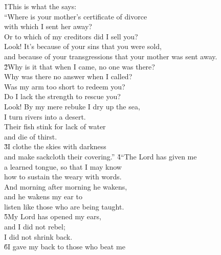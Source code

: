 \begin{poetry}
\poeml {}
\v{1}This is what the  says: \\
\poeml ``Where is your mother's certificate of divorce \\
\poemll    with which I sent her away? \\
\poeml Or to which of my creditors did I sell you? \\
\poemll    Look! It's because of your sins that you were sold, \\
\poemlll       and because of your transgressions that your mother was sent away. \\
\poeml \v{2}Why is it that when I came, no one was there? \\
\poemll    Why was there no answer when I called? \\
\poeml Was my arm too short to redeem you? \\
\poemll    Do I lack the strength to rescue you? \\
\poeml Look! By my mere rebuke I dry up the sea, \\
\poemll    I turn rivers into a desert. \\
\poeml Their fish stink for lack of water \\
\poemll    and die of thirst. \\
\poeml \v{3}I clothe the skies with darkness \\
\poemll    and make sackcloth their covering.''
\poeml \v{4}``The Lord  has given me \\
\poemll    a learned tongue, so that I may know \\
\poemlll       how to sustain the weary with words. \\
\poeml And morning after morning he wakens, \\
\poemll    and he wakens my ear to \\
\poemlll       listen like those who are being taught. \\
\poeml \v{5}My Lord  has opened my ears, \\
\poemll    and I did not rebel; \\
\poemlll       I did not shrink back. \\
\poeml \v{6}I gave my back to those who beat me \\

\end{poetry}
